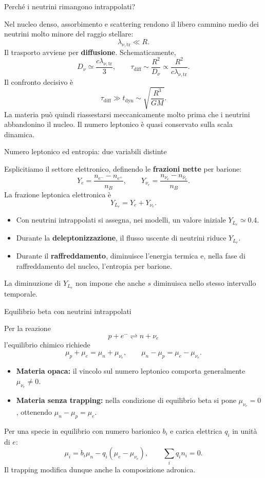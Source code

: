 \begin{frame}[t,label=pns-completa-03]{Perch\'e i neutrini rimangono intrappolati?}
\small\raggedright
Nel nucleo denso, assorbimento e scattering rendono il libero
cammino medio dei neutrini molto minore del raggio stellare:
\[
 \lambda_{\nu,\mathrm{tr}}\ll R.
\]
Il trasporto avviene per \textbf{diffusione}. Schematicamente,
\[
 D_\nu\simeq\frac{c\lambda_{\nu,\mathrm{tr}}}{3},
 \qquad \tau_{\mathrm{diff}}\sim\frac{R^2}{D_\nu}
 \propto\frac{R^2}{c\lambda_{\nu,\mathrm{tr}}}.
\]
Il confronto decisivo \`e
\[
 \boxed{\tau_{\mathrm{diff}}\gg
 t_{\mathrm{dyn}}\sim\sqrt{\frac{R^3}{GM}}}.
\]
La materia pu\`o quindi riassestarsi meccanicamente molto prima
che i neutrini abbandonino il nucleo.
Il numero leptonico \`e quasi conservato sulla scala dinamica.
\end{frame}

\begin{frame}[t,label=pns-completa-04]{Numero leptonico ed entropia: due variabili distinte}
\small\raggedright
Esplicitiamo il settore elettronico, definendo le
\textbf{frazioni nette} per barione:
\[
 Y_e=\frac{n_{e^-}-n_{e^+}}{n_B},
 \qquad Y_{\nu_e}=\frac{n_{\nu_e}-n_{\bar\nu_e}}{n_B}.
\]
La frazione leptonica elettronica \`e
\[
 \boxed{Y_{L_e}=Y_e+Y_{\nu_e}}.
\]
\begin{itemize}
 \item Con neutrini intrappolati si assegna, nei modelli,
 un valore iniziale $Y_{L_e}\simeq0.4$.
 \item Durante la \textbf{deleptonizzazione}, il flusso uscente
 di neutrini riduce $Y_{L_e}$.
 \item Durante il \textbf{raffreddamento}, diminuisce l'energia
 termica e, nella fase di raffreddamento del nucleo,
 l'entropia per barione.
\end{itemize}
La diminuzione di $Y_{L_e}$ non impone che anche $s$
diminuisca nello stesso intervallo temporale.
\end{frame}

\begin{frame}[t,label=pns-completa-05]{Equilibrio beta con neutrini intrappolati}
\small\raggedright
Per la reazione
\[
 p+e^-\rightleftharpoons n+\nu_e
\]
l'equilibrio chimico richiede
\[
 \mu_p+\mu_e=\mu_n+\mu_{\nu_e},
 \qquad\boxed{\mu_n-\mu_p=\mu_e-\mu_{\nu_e}}.
\]
\begin{itemize}
 \item \textbf{Materia opaca:} il vincolo sul numero leptonico
 comporta generalmente $\mu_{\nu_e}\ne0$.
 \item \textbf{Materia senza trapping:} nella condizione
 di equilibrio beta si pone $\mu_{\nu_e}=0$, ottenendo
 $\mu_n-\mu_p=\mu_e$.
\end{itemize}
Per una specie in equilibrio con numero barionico $b_i$
e carica elettrica $q_i$ in unit\`a di $e$:
\[
 \boxed{\mu_i=b_i\mu_n-q_i(\mu_e-\mu_{\nu_e})},
 \qquad\sum_i q_i n_i=0.
\]
Il trapping modifica dunque anche la composizione adronica.
\end{frame}

